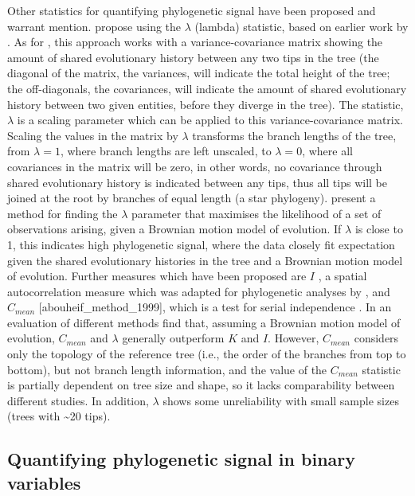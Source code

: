 Other statistics for quantifying phylogenetic signal have been proposed and warrant mention. \textcite{freckleton_phylogenetic_2002} propose using the \(\lambda\) (lambda) statistic, based on earlier work by \textcite{pagel_inferring_1999}. As for \textcite{blomberg_testing_2003}, this approach works with a variance-covariance matrix showing the amount of shared evolutionary history between any two tips in the tree (the diagonal of the matrix, the variances, will indicate the total height of the tree; the off-diagonals, the covariances, will indicate the amount of shared evolutionary history between two given entities, before they diverge in the tree). The statistic, \(\lambda\) is a scaling parameter which can be applied to this variance-covariance matrix. Scaling the values in the matrix by \(\lambda\) transforms the branch lengths of the tree, from \(\lambda = 1\), where branch lengths are left unscaled, to \(\lambda = 0\), where all covariances in the matrix will be zero, in other words, no covariance through shared evolutionary history is indicated between any tips, thus all tips will be joined at the root by branches of equal length (a star phylogeny). \textcite{freckleton_phylogenetic_2002} present a method for finding the \(\lambda\) parameter that maximises the likelihood of a set of observations arising, given a Brownian motion model of evolution. If \(\lambda\) is close to 1, this indicates high phylogenetic signal, where the data closely fit expectation given the shared evolutionary histories in the tree and a Brownian motion model of evolution. Further measures which have been proposed are \(I\) \autocite{moran_notes_1950}, a spatial autocorrelation measure which was adapted for phylogenetic analyses by \textcite{gittleman_adaptation:_1990}, and \(C_{mean}\) {[}abouheif\_method\_1999{]}, which is a test for serial independence \autocite[for an overview, see][]{munkemuller_how_2012}. In an evaluation of different methods \textcite{munkemuller_how_2012} find that, assuming a Brownian motion model of evolution, \(C_{mean}\) and \(\lambda\) generally outperform \(K\) and \(I\). However, \(C_{mean}\) considers only the topology of the reference tree (i.e., the order of the branches from top to bottom), but not branch length information, and the value of the \(C_{mean}\) statistic is partially dependent on tree size and shape, so it lacks comparability between different studies. In addition, \(\lambda\) shows some unreliability with small sample sizes (trees with \textasciitilde{}20 tips).

\hypertarget{phylo-sig-bin}{%
\subsection{Quantifying phylogenetic signal in binary variables}\label{phylo-sig-bin}}

